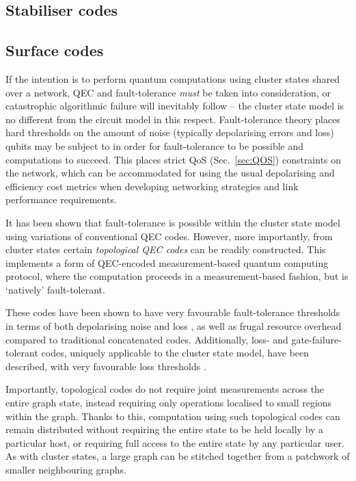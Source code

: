 \subsection{Stabiliser codes}\label{sec:stab_code}


%
%

\subsection{Surface codes}


If the intention is to perform quantum computations using cluster states shared over a network, QEC and fault-tolerance \textit{must} be taken into consideration, or catastrophic algorithmic failure will inevitably follow -- the cluster state model is no different from the circuit model in this respect. Fault-tolerance theory places hard thresholds on the amount of noise (typically depolarising errors and loss) qubits may be subject to in order for fault-tolerance to be possible and computations to succeed. This places strict QoS (Sec.~\ref{sec:QOS}) constraints on the network, which can be accommodated for using the usual depolarising and efficiency cost metrics when developing networking strategies and link performance requirements.

It has been shown that fault-tolerance is possible within the cluster state model \cite{bib:NielsenDawson04, bib:Dawson06} using variations of conventional QEC codes. However, more importantly, from cluster states certain \textit{topological QEC codes} \cite{???} can be readily constructed. This implements a form of QEC-encoded measurement-based quantum computing protocol, where the computation proceeds in a measurement-based fashion, but is `natively' fault-tolerant.

These codes have been shown to have very favourable fault-tolerance thresholds in terms of both depolarising noise and loss \cite{bib:StaceBarrettDohertyLoss, bib:BarrettStaceFT}, as well as frugal resource overhead compared to traditional concatenated codes. Additionally, loss- and gate-failure-tolerant codes, uniquely applicable to the cluster state model, have been described, with very favourable loss thresholds \cite{bib:Varnava05, bib:RalphHayes05, bib:Duan05}. 

Importantly, topological codes do not require joint measurements across the entire graph state, instead requiring only operations localised to small regions within the graph. Thanks to this, computation using such topological codes can remain distributed without requiring the entire state to be held locally by a particular host, or requiring full access to the entire state by any particular user. As with cluster states, a large graph can be stitched together from a patchwork of smaller neighbouring graphs.

